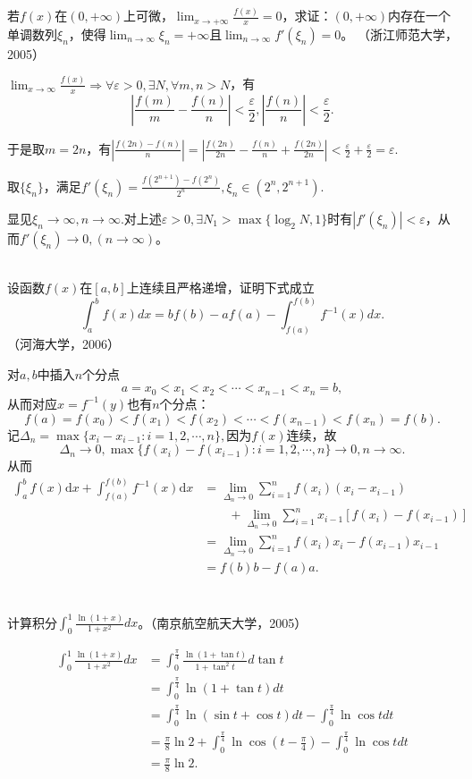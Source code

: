   \begin{example}
  若$f(x)$在$(0,+\infty)$上可微，$\displaystyle\lim_{x\rightarrow+\infty}\frac{f(x)}x=0$，求证：$(0,+\infty)$内存在一个单调数列${\xi_n}$，使得$\displaystyle\lim_{n\rightarrow\infty}\xi_n=+\infty$且$\displaystyle\lim_{n\rightarrow\infty}f'(\xi_n)=0$。 （浙江师范大学，2005）
  
  
  $\lim_{x\rightarrow\infty}\frac{f(x)}{x}\Longrightarrow\forall\varepsilon>0,\exists N,\forall m,n>N$，有$$|\frac{f(m)}{m}-\frac{f(n)}{n}|<\frac{\varepsilon}{2},|\frac{f(n)}n|<\frac{\varepsilon}{2}.$$
  
  于是取$m=2n$，有$|\frac{f(2n)-f(n)}{n}|=|\frac{f(2n)}{2n}-\frac{f(n)}{n}+\frac{f(2n)}{2n}|<\frac{\varepsilon}{2}+\frac{\varepsilon}{2}=\varepsilon.$
  
  取$\{\xi_n\}$，满足$f'(\xi_n)=\frac{f(2^{n+1})-f(2^n)}{2^n},\xi_n\in(2^n,2^{n+1}).$
  
  显见$\xi_n\rightarrow\infty,n\rightarrow\infty.$对上述$\varepsilon>0,\exists N_1>\max\{\log_2N,1\}$时有$|f'(\xi_n)|<\varepsilon$，从而$f'(\xi_n)\rightarrow0,(n\rightarrow\infty)$。
  \end{example}
  \begin{example}
  \hfill\\
  设函数$f(x)$在$[a,b]$上连续且严格递增，证明下式成立$$\int_a^bf(x)dx=bf(b)-af(a)-\int_{f(a)}^{f(b)}f^{-1}(x)dx.$$（河海大学，2006）

对$a,b$中插入$n$个分点$$a=x_0<x_1<x_2<\cdots<x_{n-1}<x_n=b,$$
从而对应$x=f^{-1}(y)$也有$n$个分点：
$$f(a)=f(x_0)<f(x_1)<f(x_2)<\cdots<f(x_{n-1})<f(x_n)=f(b).$$
记$\Delta_n=\max\{x_i-x_{i-1}:i=1,2,\cdots,n\},$因为$f(x)$连续，故
$$\Delta_n\rightarrow0,\max\{f(x_i)-f(x_{i-1}):i=1,2,\cdots,n\}\rightarrow0,n\rightarrow\infty.$$
从而
\begin{align*}
\int_a^bf(x)\mathrm{d}x+\int_{f(a)}^{f(b)}f^{-1}(x)\mathrm{d}x&=\lim_{\Delta_n\rightarrow0}\sum_{i=1}^nf(x_i)(x_i-x_{i-1})\\
&\qquad+\lim_{\Delta_n\rightarrow0}\sum_{i=1}^nx_{i-1}[f(x_i)-f(x_{i-1})]\\
&=\lim_{\Delta_n\rightarrow0}\sum_{i=1}^nf(x_i)x_i-f(x_{i-1})x_{i-1}\\
&=f(b)b-f(a)a.\\
\end{align*}
\end{example}
\begin{example}
\hfill\\
计算积分$\int_0^1\frac{\ln(1+x)}{1+x^2}dx$。（南京航空航天大学，2005）
  
  \begin{align*}
  \int_0^1\frac{\ln(1+x)}{1+x^2}dx&=\int_0^{\frac{\pi}{4}}\frac{\ln(1+\tan t)}{1+\tan^2t}d\tan t\\
  &=\int_0^{\frac{\pi}{4}}\ln(1+\tan t)dt\\
  &=\int_0^{\frac{\pi}{4}}\ln(\sin t+\cos t)dt-\int_0^{\frac{\pi}{4}}\ln\cos tdt\\
  &=\frac{\pi}{8}\ln2+\int_0^{\frac{\pi}{4}}\ln\cos(t-\frac{\pi}{4})-\int_0^{\frac{\pi}{4}}\ln\cos tdt\\
  &=\frac{\pi}{8}\ln2.\\
  \end{align*}
\end{example}
